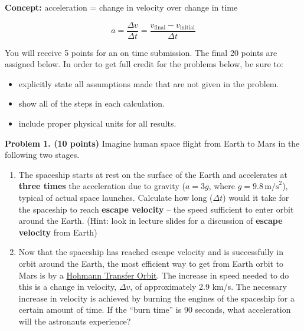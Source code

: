 \documentclass[12pt]{article}
\begin{document}
\vspace{1cm}

\noindent
\textbf{Concept:} acceleration = change in velocity over change in time

\[
a = \frac{\Delta v}{\Delta t} = \frac{v_{\text{final}} - v_{\text{initial}}}{\Delta t}
\]

\vspace{0.5cm}

\noindent You will receive 5 points for an on time submission. The final 20
points are assigned below. In order to get full credit for the problems below,
be sure to:
\begin{itemize}
    \item explicitly state all assumptions made that are not given in the
    problem.
    \vspace{-10pt}
    \item show all of the steps in each calculation.
    \vspace{-10pt}
    \item include proper physical units for all results.
\end{itemize}


\noindent
\textbf{Problem 1. (10 points)} Imagine human space flight from Earth to Mars in
the following two stages.

\begin{enumerate}
    \item[a.] The spaceship starts at rest on the surface of the Earth and
    accelerates at \textbf{three times} the acceleration due to gravity (\(a =
    3g\), where \(g = 9.8 \, \text{m/s}^2\)), typical of actual space launches.
    Calculate how long (\(\Delta t\)) would it take for the spaceship to reach
    \textbf{escape velocity} – the speed sufficient to enter orbit around the
    Earth. (Hint: look in lecture slides for a discussion of \textbf{escape velocity} from Earth)
    
    \item[b.] Now that the spaceship has reached escape velocity and is
    successfully in orbit around the Earth, the most efficient way to get from
    Earth orbit to Mars is by a 
    \href{https://en.wikipedia.org/wiki/Hohmann_transfer_orbit}{Hohmann Transfer
    Orbit}.  The increase in speed needed to do this is a change in velocity,
    \(\Delta v\), of approximately 2.9 km/s. The necessary increase in velocity
    is achieved by burning the engines of the spaceship for a certain amount of
    time. If the “burn time” is 90 seconds, what acceleration will the
    astronauts experience?
\end{enumerate}
\end{document}
